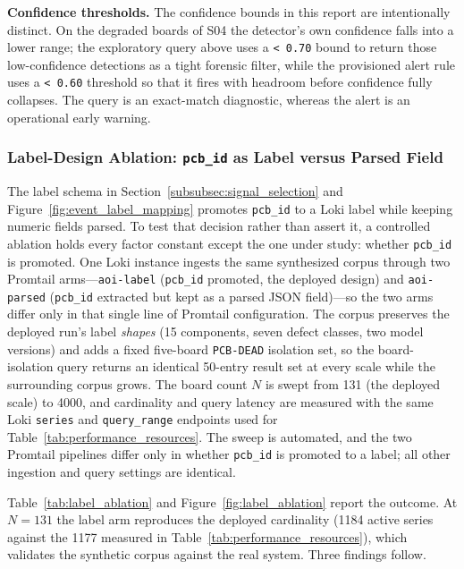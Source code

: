 \documentclass[12pt,a4paper]{article}
\begin{document}
\textbf{Confidence thresholds.} The confidence bounds in this report are
intentionally distinct. On the degraded boards of S04 the detector's own
confidence falls into a lower range; the exploratory query above uses a
\texttt{< 0.70} bound to return those low-confidence detections as a tight
forensic filter, while the provisioned alert rule uses a \texttt{< 0.60}
threshold so that it fires with headroom before confidence fully collapses. The
query is an exact-match diagnostic, whereas the alert is an operational early
warning.

\FloatBarrier

\subsubsection{Label-Design Ablation: \texttt{pcb\_id} as Label versus Parsed Field}\label{subsubsec:label_ablation}
The label schema in Section~\ref{subsubsec:signal_selection} and
Figure~\ref{fig:event_label_mapping} promotes \texttt{pcb\_id} to a Loki label
while keeping numeric fields parsed. To test that decision rather than assert it,
a controlled ablation holds every factor constant except the one under study:
whether \texttt{pcb\_id} is promoted. One Loki instance ingests the same
synthesized corpus through two Promtail arms---\texttt{aoi-label} (\texttt{pcb\_id}
promoted, the deployed design) and \texttt{aoi-parsed} (\texttt{pcb\_id} extracted
but kept as a parsed JSON field)---so the two arms differ only in that single line
of Promtail configuration. The corpus preserves the deployed run's label
\emph{shapes} (15 components, seven defect classes, two model versions) and adds a
fixed five-board \texttt{PCB-DEAD} isolation set, so the board-isolation query
returns an identical 50-entry result set at every scale while the surrounding
corpus grows. The board count $N$ is swept from 131 (the deployed scale) to 4000,
and cardinality and query latency are measured with the same Loki \texttt{series}
and \texttt{query\_range} endpoints used for Table~\ref{tab:performance_resources}.
The sweep is automated, and the two Promtail pipelines differ only in whether
\texttt{pcb\_id} is promoted to a label; all other ingestion and query settings
are identical.

Table~\ref{tab:label_ablation} and Figure~\ref{fig:label_ablation} report the
outcome. At $N=131$ the label arm reproduces the deployed cardinality (1184 active
series against the 1177 measured in Table~\ref{tab:performance_resources}), which
validates the synthetic corpus against the real system. Three findings follow.
\end{document}
